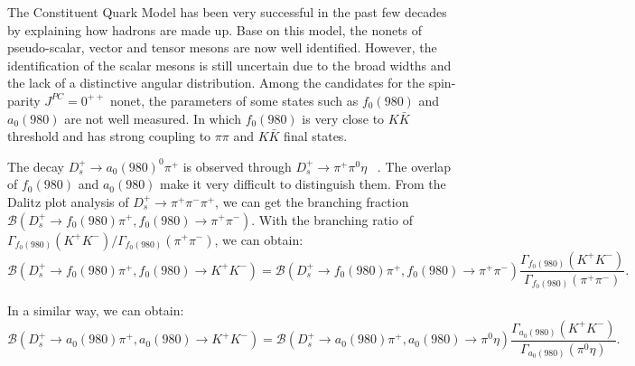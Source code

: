 \par{
    The Constituent Quark Model has been very successful in the past few decades by explaining how hadrons are made up.
    Base on this model, the nonets of pseudo-scalar, vector and tensor mesons are now well identified.
    However, the identification of the scalar mesons is still uncertain due to the broad widths and the lack of a distinctive angular distribution.
    Among the candidates for the spin-parity $J^{PC}=0^{++}$ nonet, the parameters of some states such as $f_{0}(980)$ and $a_{0}(980)$ are not well measured.
    In which $f_{0}(980)$ is very close to $K\bar{K}$ threshold and has strong coupling to $\pi\pi$ and $K\bar{K}$ final states.
    
    
    The decay $D_{s}^{+} \rightarrow a_{0}(980)^{0}\pi^{+}$ is observed through $D_{s}^{+} \rightarrow \pi^{+}\pi^{0}\eta$ ~\cite{Doc-DB-682-v7}.
    The overlap of $f_{0}(980)$ and $a_{0}(980)$ make it very difficult to distinguish them.
    From the Dalitz plot analysis of $D_{s}^{+} \rightarrow \pi^{+}\pi^{-}\pi^{+}$, we can get the branching fraction $\mathcal{B}(D_{s}^{+} \rightarrow f_{0}(980)\pi^{+}, f_{0}(980) \rightarrow \pi^{+}\pi^{-})$.
    With the branching ratio of $\Gamma_{f_{0}(980)}(K^{+}K^{-})/\Gamma_{f_{0}(980)}(\pi^{+}\pi^{-})$, we can obtain:
    \begin{equation}
            \mathcal{B}(D_{s}^{+} \rightarrow f_{0}(980)\pi^{+}, f_{0}(980) \rightarrow K^{+}K^{-}) =\mathcal{B}(D_{s}^{+} \rightarrow f_{0}(980)\pi^{+}, f_{0}(980) \rightarrow \pi^{+}\pi^{-})  \frac{\Gamma_{f_{0}(980)}(K^{+}K^{-})}{ \Gamma_{f_{0}(980)}(\pi^{+}\pi^{-})}. \label{bf-f0}
    \end{equation}
    
    In a similar way, we can obtain:
    \begin{equation}
            \mathcal{B}(D_{s}^{+} \rightarrow a_{0}(980)\pi^{+}, a_{0}(980) \rightarrow K^{+}K^{-}) =\mathcal{B}(D_{s}^{+} \rightarrow a_{0}(980)\pi^{+}, a_{0}(980) \rightarrow \pi^{0}\eta)  \frac{\Gamma_{a_{0}(980)}(K^{+}K^{-})}{ \Gamma_{a_{0}(980)}(\pi^{0}\eta)}. \label{bf-a0} 
    \end{equation}
    
}
